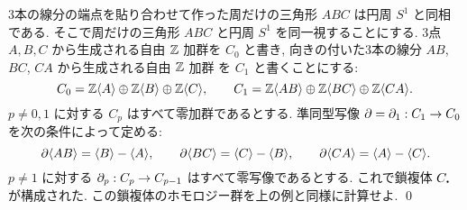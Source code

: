 \documentclass[12pt,twoside]{jarticle}
\begin{document}
\begin{question}
\label{q:S^1-sc}
  3本の線分の端点を貼り合わせて作った周だけの三角形 $ABC$ 
  は円周 $S^1$ と同相である.
  そこで周だけの三角形 $ABC$ と円周 $S^1$ を同一視することにする.
  3点 $A,B,C$ から生成される自由 ${\mathbb Z}$ 加群を $C_0$ と書き,
  向きの付いた3本の線分 $AB$, $BC$, $CA$ から生成される自由 ${\mathbb Z}$ 加群
  を $C_1$ と書くことにする:
  \begin{equation*}
    C_0 = {\mathbb Z}\langle A\rangle\oplus{\mathbb Z}\langle B\rangle\oplus{\mathbb Z}\langle C\rangle,
    \qquad
    C_1 = {\mathbb Z}\langle AB\rangle\oplus{\mathbb Z}\langle BC\rangle\oplus{\mathbb Z}\langle CA\rangle.
  \end{equation*}
  $p\ne 0,1$ に対する $C_p$ はすべて零加群であるとする.
  準同型写像 $\partial=\partial_1:C_1\to C_0$ を次の条件によって定める:
  \begin{equation*}
    \partial\langle AB\rangle = \langle B\rangle - \langle A \rangle, \qquad
    \partial\langle BC\rangle = \langle C\rangle - \langle B \rangle, \qquad
    \partial\langle CA\rangle = \langle A\rangle - \langle C \rangle.
  \end{equation*}
  $p\ne 1$ に対する $\partial_p:C_p\to C_{p-1}$ はすべて零写像であるとする.
  これで鎖複体 $C_\bcdot$ が構成された.
  この鎖複体のホモロジー群を上の例と同様に計算せよ.
  \qed
\end{question}
\end{document}
